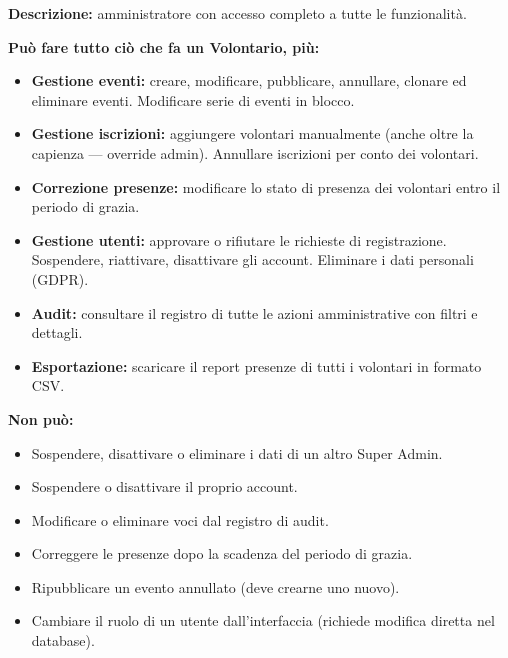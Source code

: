 \documentclass[a4paper,11pt,oneside]{book}
\begin{document}
\begin{tcolorbox}[
  enhanced,
  colback=namoLightGreen,
  colframe=namoGreen,
  coltitle=white,
  fonttitle=\bfseries\large,
  title={Scheda rapida --- Super Admin},
  left=8pt, right=8pt, top=8pt, bottom=8pt,
  arc=6pt,
  boxrule=1pt,
]

\textbf{Descrizione:} amministratore con accesso completo a tutte le funzionalit\`a.

\vspace{0.5em}
\textbf{Pu\`o fare tutto ci\`o che fa un Volontario, pi\`u:}
\begin{itemize}[leftmargin=1.5em, topsep=2pt, itemsep=2pt]
  \item \textbf{Gestione eventi:} creare, modificare, pubblicare, annullare, clonare ed eliminare eventi. Modificare serie di eventi in blocco.
  \item \textbf{Gestione iscrizioni:} aggiungere volontari manualmente (anche oltre la capienza --- override admin). Annullare iscrizioni per conto dei volontari.
  \item \textbf{Correzione presenze:} modificare lo stato di presenza dei volontari entro il periodo di grazia.
  \item \textbf{Gestione utenti:} approvare o rifiutare le richieste di registrazione. Sospendere, riattivare, disattivare gli account. Eliminare i dati personali (GDPR).
  \item \textbf{Audit:} consultare il registro di tutte le azioni amministrative con filtri e dettagli.
  \item \textbf{Esportazione:} scaricare il report presenze di tutti i volontari in formato CSV.
\end{itemize}

\vspace{0.5em}
\textbf{Non pu\`o:}
\begin{itemize}[leftmargin=1.5em, topsep=2pt, itemsep=2pt]
  \item Sospendere, disattivare o eliminare i dati di un altro Super Admin.
  \item Sospendere o disattivare il proprio account.
  \item Modificare o eliminare voci dal registro di audit.
  \item Correggere le presenze dopo la scadenza del periodo di grazia.
  \item Ripubblicare un evento annullato (deve crearne uno nuovo).
  \item Cambiare il ruolo di un utente dall'interfaccia (richiede modifica diretta nel database).
\end{itemize}


\end{tcolorbox}
\end{document}
